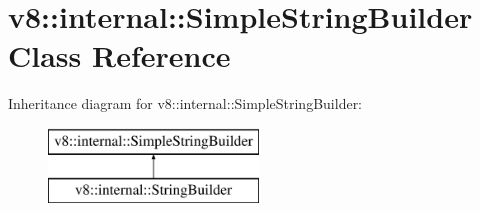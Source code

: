 \hypertarget{classv8_1_1internal_1_1_simple_string_builder}{}\section{v8\+:\+:internal\+:\+:Simple\+String\+Builder Class Reference}
\label{classv8_1_1internal_1_1_simple_string_builder}
Inheritance diagram for v8\+:\+:internal\+:\+:Simple\+String\+Builder\+:\begin{figure}[H]
\begin{center}
\leavevmode
\includegraphics[height=2.000000cm]{classv8_1_1internal_1_1_simple_string_builder}
\end{center}
\end{figure}
